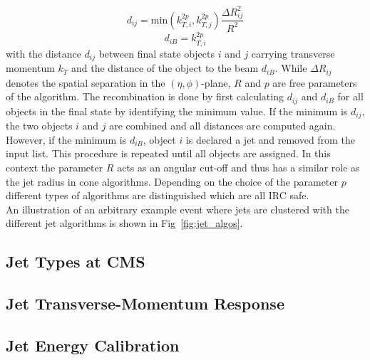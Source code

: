 \begin{description}
\begin{equation*}
d_{ij} = \mathrm{min}(k_{T,i}^{2p}, k_{T,j}^{2p}) \frac{\Delta R_{ij}^2}{R^2}
\end{equation*}
\begin{equation*}
d_{iB} = k_{T,i}^{2p}
\end{equation*}
with the distance $d_{ij}$ between final state objects $i$ and $j$ carrying transverse momentum $k_T$ and the distance of the object to the beam $d_{iB}$. While $\Delta R_{ij}$ denotes the spatial separation in the $(\eta, \phi)$-plane, $R$ and $p$ are free parameters of the algorithm. The recombination is done by first calculating $d_{ij}$ and $d_{iB}$ for all objects in the final state by identifying the minimum value. If the minimum is $d_{ij}$, the two objects $i$ and $j$ are combined and all distances are computed again. However, if the minimum is $d_{iB}$, object $i$ is declared a jet and removed from the input list. This procedure is repeated until all objects are assigned. In this context the parameter $R$ acts as an angular cut-off and thus has a similar role as the jet radius in cone algorithms. Depending on the choice of the parameter $p$ different types of algorithms are distinguished which are all IRC safe.  \\
  
An illustration of an arbitrary example event where jets are clustered with the different jet algorithms is shown in Fig~\ref{fig:jet_algos}.
\end{description}

\subsection{Jet Types at CMS}
\label{subsec:jets_types}

\subsection{Jet Transverse-Momentum Response}
\label{subsec:jets_response}

\subsection{Jet Energy Calibration}
\label{subsec:jets_calib}

